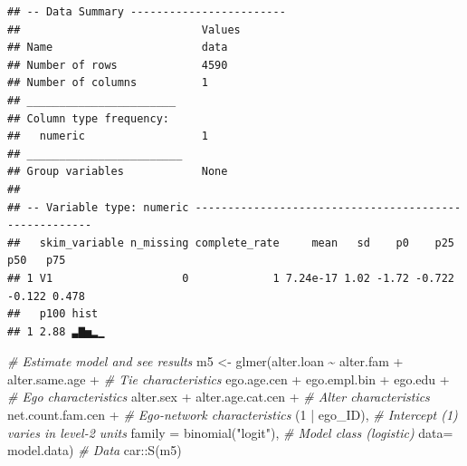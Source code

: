 \documentclass[
]{book}
\newenvironment{Shaded}{\begin{snugshade}}{\end{snugshade}}
\newcommand{\AttributeTok}[1]{\textcolor[rgb]{0.77,0.63,0.00}{#1}}
\newcommand{\CommentTok}[1]{\textcolor[rgb]{0.56,0.35,0.01}{\textit{#1}}}
\newcommand{\DecValTok}[1]{\textcolor[rgb]{0.00,0.00,0.81}{#1}}
\newcommand{\DocumentationTok}[1]{\textcolor[rgb]{0.56,0.35,0.01}{\textbf{\textit{#1}}}}
\newcommand{\FunctionTok}[1]{\textcolor[rgb]{0.00,0.00,0.00}{#1}}
\newcommand{\NormalTok}[1]{#1}
\newcommand{\OtherTok}[1]{\textcolor[rgb]{0.56,0.35,0.01}{#1}}
\newcommand{\SpecialCharTok}[1]{\textcolor[rgb]{0.00,0.00,0.00}{#1}}
\newcommand{\StringTok}[1]{\textcolor[rgb]{0.31,0.60,0.02}{#1}}
\begin{document}
\begin{Shaded}
\end{Shaded}

\begin{verbatim}
## -- Data Summary ------------------------
##                            Values
## Name                       data  
## Number of rows             4590  
## Number of columns          1     
## _______________________          
## Column type frequency:           
##   numeric                  1     
## ________________________         
## Group variables            None  
## 
## -- Variable type: numeric ------------------------------------------------------
##   skim_variable n_missing complete_rate     mean   sd    p0    p25    p50   p75
## 1 V1                    0             1 7.24e-17 1.02 -1.72 -0.722 -0.122 0.478
##   p100 hist 
## 1 2.88 ▃▇▅▂▁
\end{verbatim}

\begin{Shaded}
\begin{Highlighting}[]
\CommentTok{\# Estimate model and see results}
\NormalTok{m5 }\OtherTok{\textless{}{-}} \FunctionTok{glmer}\NormalTok{(alter.loan }\SpecialCharTok{\textasciitilde{}}\NormalTok{ alter.fam }\SpecialCharTok{+}\NormalTok{ alter.same.age }\SpecialCharTok{+} \CommentTok{\# Tie characteristics}
\NormalTok{              ego.age.cen }\SpecialCharTok{+}\NormalTok{ ego.empl.bin }\SpecialCharTok{+}\NormalTok{ ego.edu }\SpecialCharTok{+} \CommentTok{\# Ego characteristics}
\NormalTok{              alter.sex }\SpecialCharTok{+}\NormalTok{ alter.age.cat.cen }\SpecialCharTok{+}  \CommentTok{\# Alter characteristics}
\NormalTok{              net.count.fam.cen }\SpecialCharTok{+} \CommentTok{\# Ego{-}network characteristics}
\NormalTok{              (}\DecValTok{1} \SpecialCharTok{|}\NormalTok{ ego\_ID), }\CommentTok{\# Intercept (1) varies in level{-}2 units}
            \AttributeTok{family =} \FunctionTok{binomial}\NormalTok{(}\StringTok{"logit"}\NormalTok{), }\CommentTok{\# Model class (logistic)}
            \AttributeTok{data=}\NormalTok{ model.data) }\CommentTok{\# Data}
\NormalTok{car}\SpecialCharTok{::}\FunctionTok{S}\NormalTok{(m5)}
\end{Highlighting}
\end{Shaded}
\end{document}
